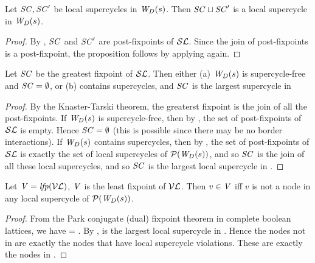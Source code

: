 %
\begin{proposition} \label{prop:supercycleLoc:union}
Let $\SC, \SC'$ be local supercycles in $\lwfg{B}{s}{\DS}$. Then $\SC \join \SC'$ is
a local supercycle in $\lwfg{B}{s}{\DS}$.
\end{proposition}
%
\begin{proof}
By , $\SC$ and $\SC'$ are post-fixpoints of $\lSFs$. Since the join of post-fixpoints is a post-fixpoint, 
the proposition follows by applying  again.
\end{proof}


\begin{proposition} \label{prop:GFPisLargestSCLoc}
Let $\SC$ be the greatest fixpoint of $\lSFs$. Then either
(a) $\lwfg{B}{s}{\DS}$  is supercycle-free and $\SC = \ewfg$, or 
(b)  contains supercycles, and $\SC$ is the largest supercycle in 
\end{proposition}
%
\begin{proof}
By the Knaster-Tarski theorem, the greaterst fixpoint is the join of all the post-fixpoints. 
If $\lwfg{B}{s}{\DS}$ is supercycle-free, then by , the set of post-fixpoints of $\lSFs$ is empty. 
Hence $\SC = \ewfg$ (this is possible since there may be no border interactions). %
If $\lwfg{B}{s}{\DS}$ contains supercycles, then by ,  the set of post-fixpoints of $\lSFs$ is exactly the set of 
local supercycles of $\lwfgS{B}{s}{\DS}$, and so $\SC$ is the join of all these local supercycles, and so $\SC$ is the largest local supercycle in .
\end{proof}



\begin{proposition} \label{prop:LFPisLocScViolations}
Let  $\VS= \lfp{\lVFs}$, \ie $\VS$ is the least fixpoint of $\lVFs$. Then $v \in \VS$ iff 
$v$ is not a node in any local supercycle of $\lwfgS{B}{s}{\DS}$.
\end{proposition}
%
\begin{proof}
From the Park conjugate (dual) fixpoint theorem in complete boolean lattices, we have 
\lfp{\VFs} = \compl{\gfp{\SFs}}.
By  , \gfp{\SFs} is the largest local supercycle in . Hence the nodes not in 
\gfp{\SFs} are exactly the nodes that have local supercycle violations. These are exactly the nodes in \lfp{\VFs}.
\end{proof}



